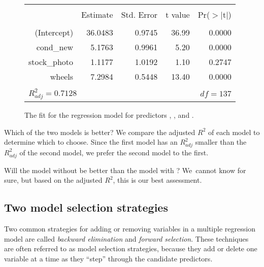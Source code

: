 \begin{figure}[ht]
\centering
\begin{tabular}{rrrrr}
  \hline
  \vspace{-3.7mm} & & & & \\
 & Estimate & Std. Error & t value & Pr($>$$|$t$|$) \\ 
  \hline
  \vspace{-3.8mm} & & & & \\
(Intercept) & 36.0483 & 0.9745 & 36.99 & 0.0000 \\ 
  cond\_\hspace{0.3mm}new & 5.1763 & 0.9961 & 5.20 & 0.0000 \\ 
  stock\_\hspace{0.3mm}photo & 1.1177 & 1.0192 & 1.10 & 0.2747 \\ 
  wheels & 7.2984 & 0.5448 & 13.40 & 0.0000 \\ 
   \hline
  \vspace{-3.6mm} & & & & \\
\multicolumn{3}{l}{$R_{adj}^2 = 0.7128$}&\multicolumn{2}{r}{$df=137$}
\end{tabular}
\caption{The fit for the regression model for predictors , , and .}
\label{marioKartMultipleRegressionModelAllButDuration}
\end{figure}

\begin{example}{Which of the two models is better?}
We compare the adjusted $R^2$ of each model to determine which to choose. Since the first model has an $R^2_{adj}$ smaller than the $R^2_{adj}$ of the second model, we prefer the second model to the first.
\end{example}

Will the model without  be better than the model with ? We~cannot know for sure, but based on the adjusted $R^2$, this is our best assessment.


\subsection{Two model selection strategies}

Two common strategies for adding or removing variables in a multiple regression model are called \emph{backward elimination} and \emph{forward selection}. These techniques are often referred to as  model selection strategies, because they add or delete one variable at a time as they ``step'' through the candidate predictors.

